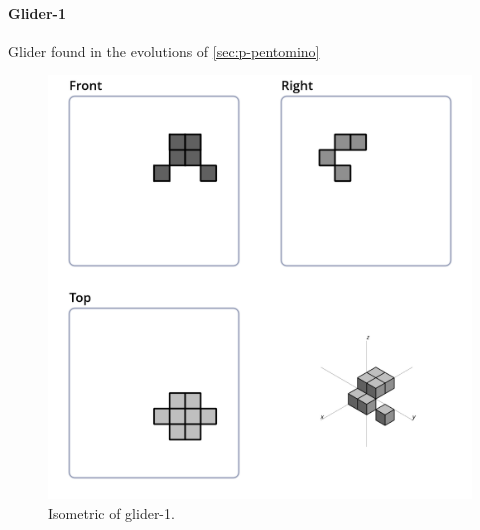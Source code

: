 \paragraph{Glider-1}
Glider found in the evolutions of \ref{sec:p-pentomino}
\begin{figure}
	\centering
	\includegraphics[scale=0.3]{iso_settings/glider_1.png}
	\caption{Isometric of glider-1.}
  \label{fig:iso-glider-1}
\end{figure}

